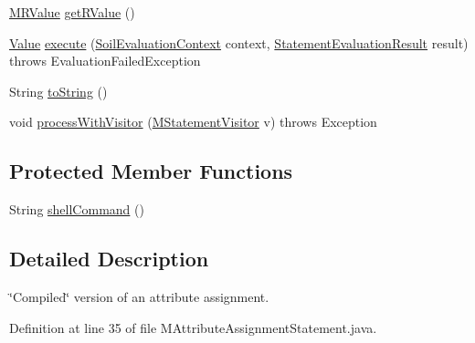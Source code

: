 \begin{DoxyCompactItemize}
\item 
\hyperlink{classorg_1_1tzi_1_1use_1_1uml_1_1sys_1_1soil_1_1_m_r_value}{M\-R\-Value} \hyperlink{classorg_1_1tzi_1_1use_1_1uml_1_1sys_1_1soil_1_1_m_attribute_assignment_statement_a8c9b67e2a878f84fab08c05ce417358a}{get\-R\-Value} ()
\item 
\hyperlink{classorg_1_1tzi_1_1use_1_1uml_1_1ocl_1_1value_1_1_value}{Value} \hyperlink{classorg_1_1tzi_1_1use_1_1uml_1_1sys_1_1soil_1_1_m_attribute_assignment_statement_ad87da372900321eb9cdce896865d41bd}{execute} (\hyperlink{classorg_1_1tzi_1_1use_1_1uml_1_1sys_1_1soil_1_1_soil_evaluation_context}{Soil\-Evaluation\-Context} context, \hyperlink{classorg_1_1tzi_1_1use_1_1uml_1_1sys_1_1_statement_evaluation_result}{Statement\-Evaluation\-Result} result)  throws Evaluation\-Failed\-Exception 
\item 
String \hyperlink{classorg_1_1tzi_1_1use_1_1uml_1_1sys_1_1soil_1_1_m_attribute_assignment_statement_a52e3b8b21719808939895ac83c8565f6}{to\-String} ()
\item 
void \hyperlink{classorg_1_1tzi_1_1use_1_1uml_1_1sys_1_1soil_1_1_m_attribute_assignment_statement_ad5bd4cdd5743f56d7260f16028e61309}{process\-With\-Visitor} (\hyperlink{interfaceorg_1_1tzi_1_1use_1_1uml_1_1sys_1_1soil_1_1_m_statement_visitor}{M\-Statement\-Visitor} v)  throws Exception 
\end{DoxyCompactItemize}
\subsection*{Protected Member Functions}
\begin{DoxyCompactItemize}
\item 
String \hyperlink{classorg_1_1tzi_1_1use_1_1uml_1_1sys_1_1soil_1_1_m_attribute_assignment_statement_ac658c8c20e1ae982b42d9019992ac429}{shell\-Command} ()
\end{DoxyCompactItemize}


\subsection{Detailed Description}
\char`\"{}\-Compiled\char`\"{} version of an attribute assignment. 

Definition at line 35 of file M\-Attribute\-Assignment\-Statement.\-java.



